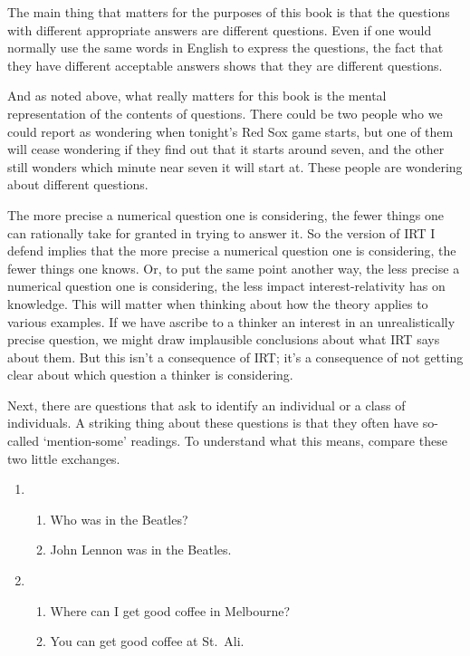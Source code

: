 \documentclass[11pt,]{book}
\providecommand{\tightlist}{%
  \setlength{\itemsep}{0pt}\setlength{\parskip}{0pt}}
\begin{document}
The main thing that matters for the purposes of this book is that the questions with different appropriate answers are different questions. Even if one would normally use the same words in English to express the questions, the fact that they have different acceptable answers shows that they are different questions.

And as noted above, what really matters for this book is the mental representation of the contents of questions. There could be two people who we could report as wondering when tonight's Red Sox game starts, but one of them will cease wondering if they find out that it starts around seven, and the other still wonders which minute near seven it will start at. These people are wondering about different questions.

The more precise a numerical question one is considering, the fewer things one can rationally take for granted in trying to answer it. So the version of IRT I defend implies that the more precise a numerical question one is considering, the fewer things one knows. Or, to put the same point another way, the less precise a numerical question one is considering, the less impact interest-relativity has on knowledge. This will matter when thinking about how the theory applies to various examples. If we have ascribe to a thinker an interest in an unrealistically precise question, we might draw implausible conclusions about what IRT says about them. But this isn't a consequence of IRT; it's a consequence of not getting clear about which question a thinker is considering.

Next, there are questions that ask to identify an individual or a class of individuals. A striking thing about these questions is that they often have so-called `mention-some' readings. To understand what this means, compare these two little exchanges.

\begin{enumerate}
\def\labelenumi{\arabic{enumi}.}
\item
  \begin{enumerate}
  \def\labelenumii{\alph{enumii}.}
  \tightlist
  \item
    Who was in the Beatles?
  \item
    John Lennon was in the Beatles.
  \end{enumerate}
\item
  \begin{enumerate}
  \def\labelenumii{\alph{enumii}.}
  \tightlist
  \item
    Where can I get good coffee in Melbourne?
  \item
    You can get good coffee at St.~Ali.
  \end{enumerate}
\end{enumerate}
\end{document}
